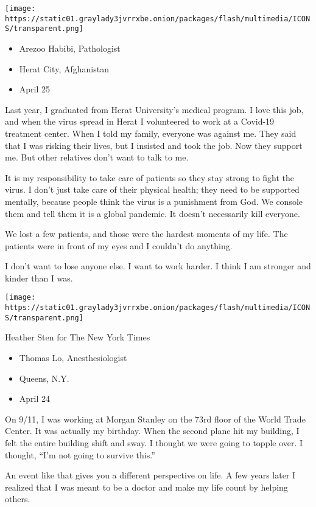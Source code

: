 \texttt{[image: https://static01.graylady3jvrrxbe.onion/packages/flash/multimedia/ICONS/transparent.png]}

\begin{itemize}
\tightlist
\item
  Arezoo Habibi, Pathologist
\item
  Herat City, Afghanistan
\item
  April 25
\end{itemize}

Last year, I graduated from Herat University's medical program. I love
this job, and when the virus spread in Herat I volunteered to work at a
Covid-19 treatment center. When I told my family, everyone was against
me. They said that I was risking their lives, but I insisted and took
the job. Now they support me. But other relatives don't want to talk to
me.

It is my responsibility to take care of patients so they stay strong to
fight the virus. I don't just take care of their physical health; they
need to be supported mentally, because people think the virus is a
punishment from God. We console them and tell them it is a global
pandemic. It doesn't necessarily kill everyone.

We lost a few patients, and those were the hardest moments of my life.
The patients were in front of my eyes and I couldn't do anything.

I don't want to lose anyone else. I want to work harder. I think I am
stronger and kinder than I was.

\texttt{[image: https://static01.graylady3jvrrxbe.onion/packages/flash/multimedia/ICONS/transparent.png]}

Heather Sten for The New York Times

\begin{itemize}
\tightlist
\item
  Thomas Lo, Anesthesiologist
\item
  Queens, N.Y.
\item
  April 24
\end{itemize}

On 9/11, I was working at Morgan Stanley on the 73rd floor of the World
Trade Center. It was actually my birthday. When the second plane hit my
building, I felt the entire building shift and sway. I thought we were
going to topple over. I thought, ``I'm not going to survive this.''

An event like that gives you a different perspective on life. A few
years later I realized that I was meant to be a doctor and make my life
count by helping others.

